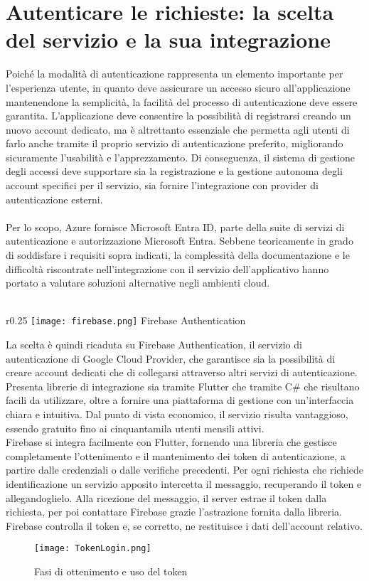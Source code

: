 
\section{Autenticare le richieste: la scelta del servizio e la sua integrazione}


Poiché la modalità di autenticazione rappresenta
un elemento importante per l'esperienza utente,
in quanto deve assicurare un accesso sicuro all'applicazione mantenendone la semplicità,
la facilità del processo di autenticazione deve essere garantita.
L'applicazione deve consentire la possibilità di registrarsi creando un nuovo account dedicato,
ma è altrettanto essenziale che permetta agli utenti di farlo anche
tramite il proprio servizio di autenticazione preferito,
migliorando sicuramente l'usabilità e l'apprezzamento.
Di conseguenza, il sistema di gestione degli accessi deve supportare
sia la registrazione e la gestione autonoma degli account specifici per il servizio,
sia fornire l'integrazione con provider di autenticazione esterni.\\
\\
Per lo scopo, Azure fornisce Microsoft Entra ID,
parte della suite di servizi di autenticazione e autorizzazione Microsoft Entra.
Sebbene teoricamente in grado di soddisfare i requisiti sopra indicati,
la complessità della documentazione e le difficoltà riscontrate nell'integrazione con il servizio dell’applicativo
hanno portato a valutare soluzioni alternative negli ambienti cloud.\\
\\
\begin{wrapfigure}{r}{0.25\textwidth}
    \centering
    \texttt{[image: firebase.png]}
    Firebase Authentication
\end{wrapfigure}
La scelta è quindi ricaduta su Firebase Authentication,
il servizio di autenticazione di Google Cloud Provider,
che garantisce sia la possibilità di creare account dedicati
che di collegarsi attraverso altri servizi di autenticazione.
Presenta librerie di integrazione sia tramite Flutter che tramite C\#
che risultano facili da utilizzare,
oltre a fornire una piattaforma di gestione con un'interfaccia chiara e intuitiva.
Dal punto di vista economico, il servizio risulta vantaggioso,
essendo gratuito fino ai cinquantamila utenti mensili attivi.\\
\clearpage
Firebase si integra facilmente con Flutter,
fornendo una libreria che gestisce completamente l'ottenimento e il mantenimento dei token di autenticazione,
a partire dalle credenziali o dalle verifiche precedenti.
Per ogni richiesta che richiede identificazione un servizio apposito intercetta il messaggio,
recuperando il token e allegandoglielo.
Alla ricezione del messaggio, il server estrae il token dalla richiesta,
per poi contattare Firebase grazie l'astrazione fornita dalla libreria.
Firebase controlla il token e, se corretto,
ne restituisce i dati dell'account relativo.\\
\begin{figure}[htpb]
    \centering
    \texttt{[image: TokenLogin.png]}
    \caption{Fasi di ottenimento e uso del token}
\end{figure}

